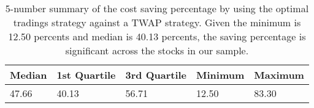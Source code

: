 \begin{table}
\centering
\caption{5-number summary of the cost saving percentage by using the optimal tradings strategy against a TWAP strategy. Given the minimum is 12.50 percents and median is 40.13 percents, the saving percentage is significant across the stocks in our sample.
}
\label{table:CostSavingSummary}
\begin{tabular}{lllll}
\toprule
Median & 1st Quartile & 3rd Quartile & Minimum & Maximum \\
\midrule
 47.66 &        40.13 &        56.71 &   12.50 &   83.30 \\
\bottomrule
\end{tabular}
\end{table}

